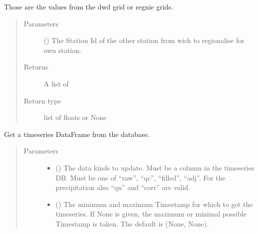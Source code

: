\documentclass[letterpaper,10pt,english]{sphinxmanual}
\begin{document}
\begin{fulllineitems}
\begin{fulllineitems}
\sphinxAtStartPar
Those are the values from the dwd grid or regnie grids.
\begin{quote}\begin{description}
\item[{Parameters}] \leavevmode
\sphinxAtStartPar
{} () \textendash{} The Station Id of the other station from wich to regionalise for own station.

\item[{Returns}] \leavevmode
\sphinxAtStartPar
A list of

\item[{Return type}] \leavevmode
\sphinxAtStartPar
list of floats or None

\end{description}\end{quote}

\end{fulllineitems}


\begin{fulllineitems}
\label{\detokenize{weatherDB:weatherDB.station.StationBase.get_df}}
\sphinxAtStartPar
Get a timeseries DataFrame from the database.
\begin{quote}\begin{description}
\item[{Parameters}] \leavevmode\begin{itemize}
\item {} 
\sphinxAtStartPar
{} () \textendash{} The data kinds to update.
Must be a column in the timeseries DB.
Must be one of “raw”, “qc”, “filled”, “adj”.
For the precipitation also “qn” and “corr” are valid.

\item {} 
\sphinxAtStartPar
{} (\sphinxstyleliteralemphasis{\sphinxupquote{, }}) \textendash{} The minimum and maximum Timestamp for which to get the timeseries.
If None is given, the maximum or minimal possible Timestamp is taken.
The default is (None, None).


\end{itemize}
\end{description}
\end{quote}
\end{fulllineitems}
\end{fulllineitems}
\end{document}
